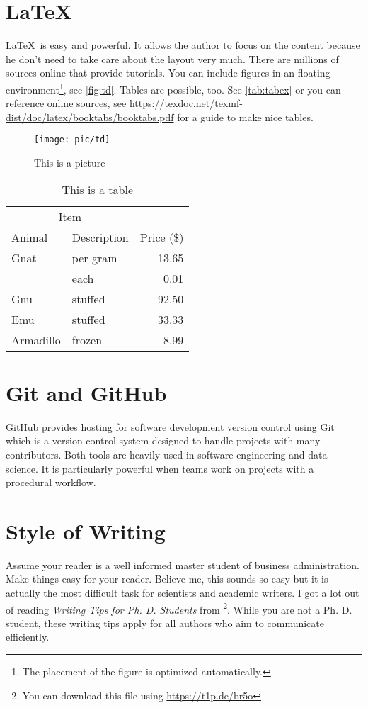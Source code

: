 \documentclass[12pt,final,a4paper,oneside]{book}
\begin{document}
	\section{\LaTeX}
	
	\LaTeX\ is easy and powerful. It allows the author to focus on the content because he don't need to take care about the layout very much. There are millions of sources online that provide tutorials. You can include figures in an floating environment\footnote{The placement of the figure is optimized automatically.}, see \autoref{fig:td}. Tables are possible, too. See \autoref{tab:tabex} or you can reference online sources, see \url{https://texdoc.net/texmf-dist/doc/latex/booktabs/booktabs.pdf} for a guide to make nice tables.
	
	\begin{figure}\centering
		\texttt{[image: pic/td]}\caption{This is a picture}\label{fig:td}
	\end{figure}
	
	\begin{table}\centering
		\caption{This is a table}\label{tab:tabex}
		\begin{tabular}{@{}llr@{}} \toprule\multicolumn{2}{c}{Item} \\ \cmidrule(r){1-2}Animal & Description & Price (\$)\\ \midrule Gnat  & per gram  & 13.65 \\& each      & 0.01 \\Gnu   & stuffed   & 92.50 \\Emu   & stuffed   & 33.33 \\Armadillo & frozen & 8.99 \\ \bottomrule
		\end{tabular}
	\end{table}
	
	\section{Git and GitHub}
	GitHub  provides hosting for software development version control using Git which is a version control system designed to handle projects with many contributors. Both tools are heavily used in software engineering and data science. It is particularly powerful when teams work on projects with a procedural workflow.
	
	\section{Style of Writing}
	Assume your reader is a well informed master student of business administration. Make things easy for your reader. Believe me, this sounds so easy but it is actually the most difficult task for scientists and academic writers. I got a lot out of reading  \textit{Writing Tips for Ph.  D. Students} from \cite{Cochrane2005Writing}\footnote{You can download this file using \url{https://t1p.de/br5o}}. While you are not a Ph. D. student, these writing tips apply for all authors who aim to communicate efficiently. 
	
	
	
	
	
	
\end{document}
